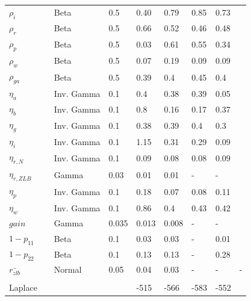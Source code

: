 \documentclass[12pt,reqno]{article}
\numberwithin{equation}{section}
\begin{document}
\begin{table}[H]
\begin{tabular}{llll|ll|lll}
$\rho_i$ &  & Beta & 0.5 		& 0.40 & 0.79 & 0.85 & 0.73 &  \\
$\rho_r$ &  & Beta & 0.5 		& 0.66 & 0.52 & 0.46 & 0.48 &  \\
$\rho_p$ &  & Beta & 0.5 		& 0.03 & 0.61 & 0.55 & 0.34 &  \\
$\rho_w$ &  & Beta & 0.5 		& 0.07 & 0.19 & 0.09 & 0.09 &  \\
$\rho_{ga}$ &  & Beta & 0.5 	& 0.39 & 0.4 & 0.45 & 0.4 &  \\
$\eta_a$ &  & Inv. Gamma & 0.1 	& 0.4 & 0.38 & 0.39 & 0.05 &  \\
$\eta_b$ &  & Inv. Gamma & 0.1 	& 0.8 & 0.16 & 0.17 & 0.37 &  \\
$\eta_g$ &  & Inv. Gamma & 0.1 			& 0.38 & 0.39 & 0.4 & 0.3 &  \\
$\eta_i$ &  & Inv. Gamma & 0.1 			& 1.15 & 0.31 & 0.29 & 0.09 &  \\
$\eta_{r,N}$ &  & Inv. Gamma & 0.1 		& 0.09 & 0.08 & 0.08 & 0.09 &  \\
$\eta_{r,ZLB}$ &  & Gamma & 0.03 		& 0.01 & 0.01 & - & - &  \\
$\eta_p$ &  & Inv. Gamma & 0.1			& 0.18 & 0.07 & 0.08 & 0.11 &  \\
$\eta_w$ &  & Inv. Gamma & 0.1 			& 0.86 & 0.4 & 0.43 & 0.42 &  \\
$gain$ &  & Gamma & 0.035 				& 0.013 & 0.008 & - & - &  \\
$1-p_{11}$ &  & Beta & 0.1 				& 0.03 & 0.03 &-  & 0.01 &  \\
$1-p_{22}$ &  & Beta & 0.1 				& 0.13 & 0.13 & - & 0.28 &  \\
$\bar{r_{zlb}}$ &  & Normal & 0.05 		& 0.04 & 0.03 & - & - & - \\
 &  &  &  &  &  &  &  &  \\
Laplace &  &  &  & -515 & -566 & -583 & -552 & 
\end{tabular}
\end{table}
\end{document}
